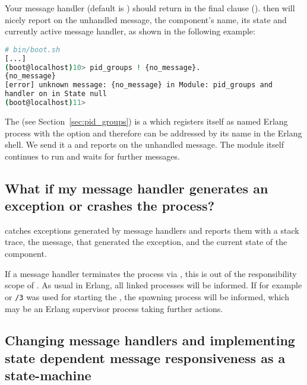Your message handler (default is )
should return  in the final clause
().   then
will nicely report on the unhandled message, the component's name, its state
and currently active message handler, as shown in the following example:

\begin{lstlisting}[language=bash]
# bin/boot.sh
[...]
(boot@localhost)10> pid_groups ! {no_message}.
{no_message}
[error] unknown message: {no_message} in Module: pid_groups and
handler on in State null
(boot@localhost)11>
\end{lstlisting}

The  (see
Section~\ref{sec:pid_groups}) is a  which
registers itself as named Erlang process with the 
option  and therefore can be addressed by its name in
the Erlang shell. We send it a  and
 reports on the unhandled message. The
 module itself continues to run and waits for
further messages.

\subsection{What if my message handler generates an exception or
 crashes the process?}

 catches exceptions generated by message handlers
and reports them with a stack trace, the message, that generated the
exception, and the current state of the component.

If a message handler terminates the process via ,
this is out of the responsibility scope of . As
usual in Erlang, all linked processes will be informed. If for example
 or \texttt{/3} was used for
starting the , the spawning process will be
informed, which may be an Erlang supervisor process taking further actions.

\subsection{Changing message handlers and implementing state dependent
 message responsiveness as a state-machine}
\label{sec:gen_component:change_handler}

